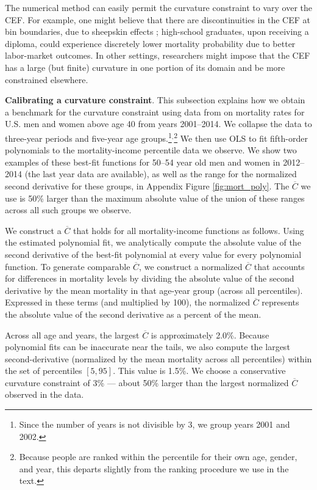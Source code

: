 The numerical method can easily permit the curvature constraint to vary over the CEF. For example, one might believe that there are discontinuities in the CEF at bin boundaries, due to sheepskin effects \citep{hungerford1987}; high-school graduates, upon receiving a diploma, could experience discretely lower mortality probability due to better labor-market outcomes. In other settings, researchers might impose that the CEF has a large (but finite) curvature in one portion of its domain and be more constrained elsewhere.

\textbf{Calibrating a curvature constraint}.  This subsection explains how we obtain a benchmark for the curvature constraint using data from \citet{Chetty2016b} on mortality rates for U.S. men and women above age 40 from years 2001--2014. We collapse the data to three-year periods and five-year age groups.\footnote{Since the number of years is not divisible by 3, we group years 2001 and 2002.}$^,$\footnote{Because people are ranked within the percentile for their own age, gender, and year, this departs slightly from the ranking procedure we use in the text.} We then use OLS to fit fifth-order polynomials to the mortality-income percentile data we observe. We show two examples of these best-fit functions for 50--54 year old men and women in 2012--2014 (the last year data are available), as well as the range for the normalized second derivative for these groups, in Appendix Figure \ref{fig:mort_poly}. The $\overline{C}$ we use is 50\% larger than the maximum absolute value of the union of these ranges across all such groups we observe.

We construct a $\overline{C}$ that holds for all mortality-income
functions as follows. Using the estimated polynomial fit, we
analytically compute the absolute value of the second derivative of
the best-fit polynomial at every value for every polynomial
function. To generate comparable $\overline{C}$, we construct a normalized $\overline{C}$ that accounts for differences in mortality levels by dividing the absolute value of the second derivative by the mean mortality in that age-year group (across all percentiles). Expressed in these terms (and multiplied by 100), the normalized $\overline{C}$ represents the absolute value of the second derivative as a percent of the mean.

Across all age and years, the largest $\overline{C}$ is approximately 2.0\%. Because polynomial fits can be inaccurate near the tails, we also compute the largest second-derivative (normalized by the mean mortality across all percentiles) within the set of percentiles $[5,95]$. This value is 1.5\%. We choose a conservative curvature constraint of 3\% --- about 50\% larger than the largest normalized $\overline{C}$ observed in the data.

